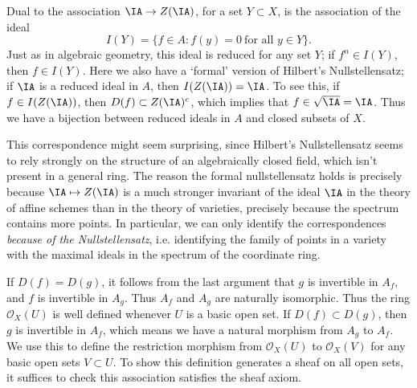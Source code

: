 \begin{remark}
    Dual to the association $\IA \to Z(\IA)$, for a set $Y \subset X$, is the association of the ideal
    \[ I(Y) = \{ f \in A: f(y) = 0\ \text{for all $y \in Y$} \}. \]
    Just as in algebraic geometry, this ideal is reduced for any set $Y$; if $f^n \in I(Y)$, then $f \in I(Y)$. Here we also have a `formal' version of Hilbert's Nullstellensatz; if $\IA$ is a reduced ideal in $A$, then $I(Z(\IA)) = \IA$. To see this, if $f \in I(Z(\IA))$, then $D(f) \subset Z(\IA)^c$, which implies that $f \in \sqrt{\IA} = \IA$. Thus we have a bijection between reduced ideals in $A$ and closed subsets of $X$.

    This correspondence might seem surprising, since Hilbert's Nullstellensatz seems to rely strongly on the structure of an algebraically closed field, which isn't present in a general ring. The reason the formal nullstellensatz holds is precisely because $\IA \mapsto Z(\IA)$ is a much stronger invariant of the ideal $\IA$ in the theory of affine schemes than in the theory of varieties, precisely because the spectrum contains more points. In particular, we can only identify the correspondences \emph{because of the Nullstellensatz}, i.e. identifying the family of points in a variety with the maximal ideals in the spectrum of the coordinate ring.
\end{remark}

If $D(f) = D(g)$, it follows from the last argument that $g$ is invertible in $A_f$, and $f$ is invertible in $A_g$. Thus $A_f$ and $A_g$ are naturally isomorphic. Thus the ring $\mathcal{O}_X(U)$ is well defined whenever $U$ is a basic open set. If $D(f) \subset D(g)$, then $g$ is invertible in $A_f$, which means we have a natural morphism from $A_g$ to $A_f$. We use this to define the restriction morphism from $\mathcal{O}_X(U)$ to $\mathcal{O}_X(V)$ for any basic open sets $V \subset U$. To show this definition generates a sheaf on all open sets, it suffices to check this association satisfies the sheaf axiom.

